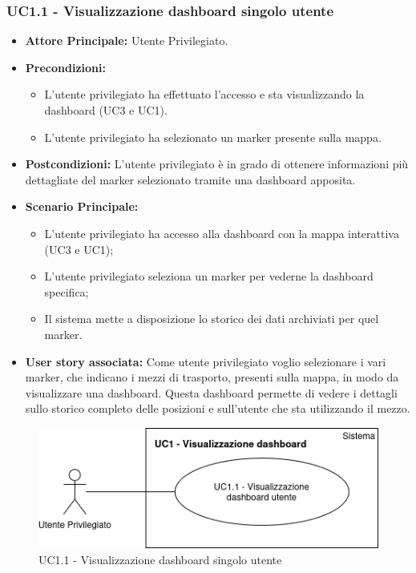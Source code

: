 \documentclass[11pt]{article}
\begin{document}
\begin{justify}
\subsubsection{\textbf{UC1.1 - Visualizzazione dashboard singolo utente}}
\label{UC1.1}
\begin{itemize}
     \item \textbf{Attore Principale:} Utente Privilegiato.
     \item \textbf{Precondizioni:}
        \begin{itemize}
    		\item L'utente privilegiato ha effettuato l'accesso e sta      visualizzando la dashboard (UC3 e UC1).
    	        \item L'utente privilegiato ha selezionato un marker presente sulla mappa.
        \end{itemize}
     \item \textbf{Postcondizioni:} L'utente privilegiato è in grado di ottenere informazioni più dettagliate del marker selezionato tramite una dashboard apposita.
     \item \textbf{Scenario Principale:}
        \begin{itemize}
            \item L'utente privilegiato ha accesso alla dashboard con la mappa interattiva (UC3 e UC1);
            \item L'utente privilegiato seleziona un marker per vederne la dashboard specifica;
            \item Il sistema mette a disposizione lo storico dei dati archiviati per quel marker.
        \end{itemize}
     \item \textbf{User story associata:}
     Come utente privilegiato voglio selezionare i vari marker, che indicano i mezzi di trasporto, presenti sulla mappa, in modo da visualizzare una dashboard. Questa dashboard permette di vedere i dettagli sullo storico completo delle posizioni e sull'utente che sta utilizzando il mezzo.
\end{itemize}
\begin{figure}[H]
    \centering
    \includegraphics[width=0.5\linewidth]{UC1.1image.png}
    \caption{UC1.1 - Visualizzazione dashboard singolo utente}
    \label{fig:UC1.1}
\end{figure}

\end{justify}
\end{document}

